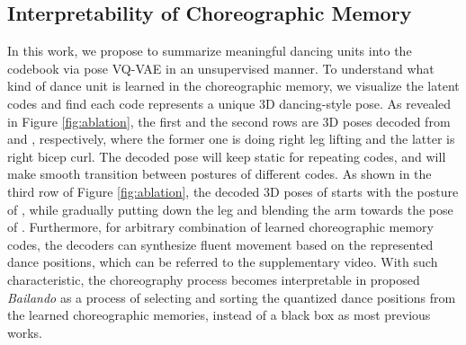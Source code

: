 \vspace{-5pt}
\subsection{Interpretability of Choreographic Memory}
\label{subsec:interpretable}
\vspace{-2pt}
In this work, we propose to  summarize meaningful dancing units into the codebook via pose VQ-VAE in an unsupervised manner.
To understand what kind of dance unit is learned in the choreographic memory, we visualize the latent codes and find each code represents a unique 3D dancing-style pose.
As revealed in Figure \ref{fig:ablation}, the first and the second rows are 3D poses decoded from  and , respectively, where the former one is doing right leg lifting and the latter is right bicep curl.
The decoded pose will keep static for repeating codes, and will make smooth transition between postures of different codes.
As shown in the third row of Figure \ref{fig:ablation}, the decoded 3D poses of  starts with the posture of , while gradually putting down the leg and blending the arm towards the pose of .
Furthermore, for arbitrary combination of learned choreographic memory codes, the decoders can synthesize fluent movement based on the represented dance positions, which can be referred to the supplementary video.
With such characteristic, the choreography process becomes interpretable in proposed  {\textit{Bailando}} as a process of selecting and sorting the quantized dance positions from the learned choreographic memories, instead of a black box as most previous works. 
%
